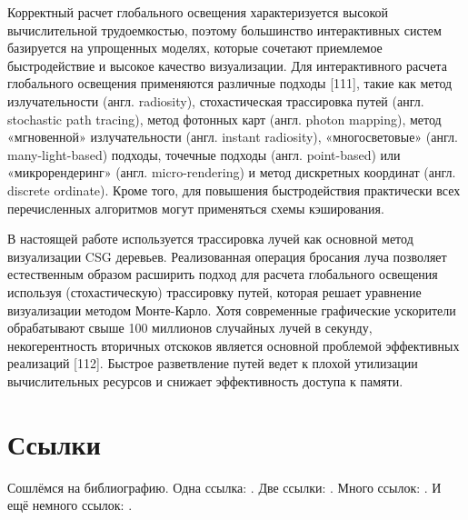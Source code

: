 {{{{Корректный расчет глобального освещения характеризуется высокой вычислительной трудоемкостью, поэтому большинство интерактивных систем базируется на упрощенных моделях, которые сочетают приемлемое быстродействие и высокое качество визуализации. Для интерактивного расчета глобального освещения применяются различные подходы [111], такие как метод излучательности (англ. radiosity), стохастическая трассировка путей (англ. stochastic path tracing), метод фотонных карт (англ. photon mapping), метод «мгновенной» излучательности (англ. instant radiosity), «многосветовые» (англ. many-light-based) подходы, точечные подходы (англ. point-based) или «микрорендеринг» (англ. micro-rendering) и метод дискретных координат (англ. discrete ordinate). Кроме того, для повышения быстродействия практически всех перечисленных алгоритмов могут применяться схемы кэширования.

В настоящей работе используется трассировка лучей как основной метод визуализации CSG деревьев. Реализованная операция бросания луча позволяет естественным образом расширить подход для расчета глобального освещения используя (стохастическую) трассировку путей, которая решает уравнение визуализации методом Монте-Карло. Хотя современные графические ускорители обрабатывают свыше 100 миллионов случайных лучей в секунду, некогерентность вторичных отскоков является основной проблемой эффективных реализаций [112]. Быстрое разветвление путей ведет к плохой утилизации вычислительных ресурсов и снижает эффективность доступа к памяти.






\section{Ссылки} \label{sect1_2}
Сошлёмся на библиографию.
Одна ссылка: \cite[с.~54]{Sokolov}\cite[с.~36]{Gaidaenko}.
Две ссылки: \cite{Sokolov,Gaidaenko}.
Много ссылок: %
\cite{Lermontov,Management,Borozda,Marketing,Constitution,FamilyCode,Gost.7.0.53,Razumovski,Lagkueva,Pokrovski,Sirotko,Lukina,Methodology,Encyclopedia,Nasirova,Berestova,Kriger}.
И ещё немного ссылок:
\cite{Article,Book,Booklet,Conference,Inbook,Incollection,Manual,Mastersthesis,Misc,Phdthesis,Proceedings,Techreport,Unpublished}.
\cite{medvedev2006jelektronnye, CEAT:CEAT581, doi:10.1080/01932691.2010.513279,Gosele1999161,Li2007StressAnalysis, Shoji199895,test:eisner-sample,AB_patent_Pomerantz_1968,iofis_patent1960}

}}}}
